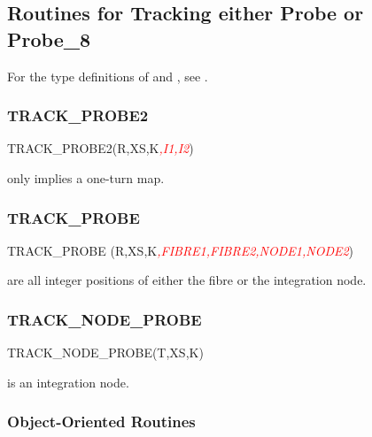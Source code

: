 \subsection{Routines for Tracking either Probe or Probe\_8}

%
For the type definitions of  and , see
.


\subsubsection{TRACK\_PROBE2}

%
\begin{ptccode}
TRACK_PROBE2(R,XS,K\textit{\textcolor{red}{,I1,I2}})
\end{ptccode}


 only implies a one-turn map.



\subsubsection{TRACK\_PROBE}

%
\begin{ptccode}
TRACK_PROBE (R,XS,K\textit{\textcolor{red}{,FIBRE1,FIBRE2,NODE1,NODE2}})
\end{ptccode}

 are all integer positions of either the
fibre or the integration node.


\subsubsection{TRACK\_NODE\_PROBE}

%
\begin{ptccode}
TRACK_NODE_PROBE(T,XS,K)
\end{ptccode}

 is an integration node.


\subsubsection{Object-Oriented Routines}

